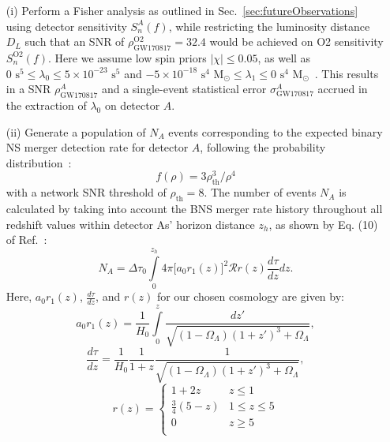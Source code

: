\documentclass[prd,twocolumn,nofootinbib,superscriptaddress,amsmath,amssymb]{revtex4-1}
\begin{document}
\begin{enumerate}
\item[(i)] Perform a Fisher analysis as outlined in Sec.~\ref{sec:futureObservations} using detector sensitivity $S_n^A(f)$, while restricting the luminosity distance $D_L$ such that an SNR of $\rho^{\text{O2}}_{\text{GW170817}}=32.4$ would be achieved on O2 sensitivity $S_n^{\text{O2}}(f)$.
Here we assume low spin priors $|\chi| \leq 0.05$, as well as $0 \text{ s}^5 \leq \lambda_0 \leq 5 \times 10^{-23} \text{ s}^5$ and $-5 \times 10^{-18} \text{ s}^4\text{ M}_{\odot} \leq \lambda_1 \leq 0 \text{ s}^4\text{ M}_{\odot}$~\cite{delPozzo:TaylorTidal}.
This results in a SNR $\rho^A_{\text{GW170817}}$ and a single-event statistical error $\sigma_\text{GW170817}^A$ accrued in the extraction of $\lambda_0$ on detector $A$.

\item[(ii)] Generate a population of $N_A$ events corresponding to the expected binary NS merger detection rate for detector $A$, following the probability distribution~\cite{Shutz:SNR,Chen:SNR}:
\begin{equation}\label{eq:population}
f(\rho)=3 \rho_{\text{th}}^3/\rho^4
\end{equation}
with a network SNR threshold of $\rho_{\text{th}}=8$.
The number of events $N_A$ is calculated by taking into account the BNS merger rate history throughout all redshift values within detector As' horizon distance $z_h$, as shown by Eq. (10) of Ref.~\cite{Cutler:BNSmerger}:
\begin{equation}
N_A=\Delta \tau_0 \int\limits^{z_{h}}_0 4 \pi \lbrack  a_0r_1(z)\rbrack^2 \mathcal{R} r(z) \frac{d \tau}{dz} dz.
\end{equation}
Here, $a_0r_1(z)$, $\frac{d\tau}{dz}$, and $r(z)$ for our chosen cosmology are given by:
\begin{equation}
a_0r_1(z) = \frac{1}{H_0}\int\limits^z_0 \frac{dz'}{\sqrt{(1-\Omega_{\Lambda})(1+z')^3+\Omega_{\Lambda}}},
\end{equation}
\begin{equation}
\frac{d\tau}{dz} = \frac{1}{H_0} \frac{1}{1+z}\frac{1}{\sqrt{(1-\Omega_{\Lambda})(1+z')^3+\Omega_{\Lambda}}},
\end{equation}
\begin{equation}
r(z) = \left\{
\begin{array}{ll}
      1+2z & z \leq 1 \\
      \frac{3}{4}(5-z) & 1\leq z\leq 5 \\
      0 & z\geq 5\\ 
\end{array} 
\right.
\end{equation}


\end{enumerate}
\end{document}
